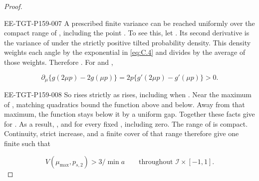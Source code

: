 \begin{proof}
\begin{EESegment}{EE-TGT-P159-007}
A prescribed finite variance can be reached uniformly over the compact
range of , including the point . To see this, let
. Its second derivative is the variance of
under the strictly positive tilted probability density. This density weights each angle by the exponential in \eqref{eq:C.4} and divides by the average of those weights. Therefore . For
 and ,
\end{EESegment}
\begin{equation}
 \partial_\mu\{g(2\mu p)-2g(\mu p)\}
 =2p\{g'(2\mu p)-g'(\mu p)\}>0.
\tag{C.6}\label{eq:C.6}
\end{equation}
\begin{EESegment}{EE-TGT-P159-008}
So  rises strictly as  rises, including when
. Near the maximum of
, matching quadratics bound the function above and below. Away from that maximum, the function stays below it by a uniform gap. Together these facts give
 for . As a result,
, and
 for
every fixed , including zero. The range of  is compact. Continuity, strict increase, and a finite cover of that range therefore give one finite  such that
\end{EESegment}
\begin{equation}
 V(\mu_{\max},p_{s,2})>3/\min a
 \qquad\text{throughout }\mathcal I\times[-1,1].
\tag{C.7}\label{eq:C.7}
\end{equation}


\end{proof}
